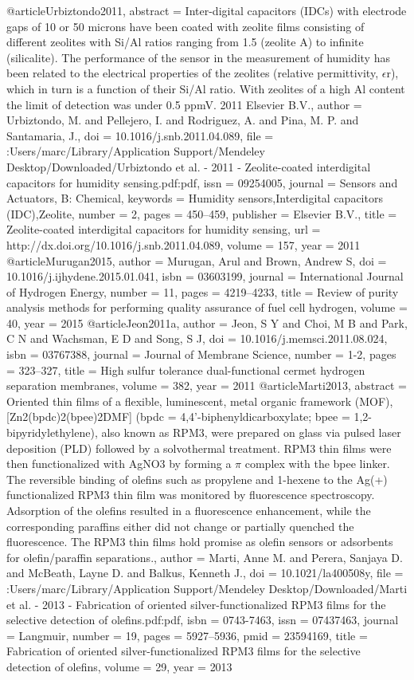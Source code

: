 @article{Urbiztondo2011,
abstract = {Inter-digital capacitors (IDCs) with electrode gaps of 10 or 50 microns have been coated with zeolite films consisting of different zeolites with Si/Al ratios ranging from 1.5 (zeolite A) to infinite (silicalite). The performance of the sensor in the measurement of humidity has been related to the electrical properties of the zeolites (relative permittivity, $\epsilon$r), which in turn is a function of their Si/Al ratio. With zeolites of a high Al content the limit of detection was under 0.5 ppmV. {\textcopyright} 2011 Elsevier B.V.},
author = {Urbiztondo, M. and Pellejero, I. and Rodriguez, A. and Pina, M. P. and Santamaria, J.},
doi = {10.1016/j.snb.2011.04.089},
file = {:Users/marc/Library/Application Support/Mendeley Desktop/Downloaded/Urbiztondo et al. - 2011 - Zeolite-coated interdigital capacitors for humidity sensing.pdf:pdf},
issn = {09254005},
journal = {Sensors and Actuators, B: Chemical},
keywords = {Humidity sensors,Interdigital capacitors (IDC),Zeolite},
number = {2},
pages = {450--459},
publisher = {Elsevier B.V.},
title = {{Zeolite-coated interdigital capacitors for humidity sensing}},
url = {http://dx.doi.org/10.1016/j.snb.2011.04.089},
volume = {157},
year = {2011}
}
@article{Murugan2015,
author = {Murugan, Arul and Brown, Andrew S},
doi = {10.1016/j.ijhydene.2015.01.041},
isbn = {03603199},
journal = {International Journal of Hydrogen Energy},
number = {11},
pages = {4219--4233},
title = {{Review of purity analysis methods for performing quality assurance of fuel cell hydrogen}},
volume = {40},
year = {2015}
}
@article{Jeon2011a,
author = {Jeon, S Y and Choi, M B and Park, C N and Wachsman, E D and Song, S J},
doi = {10.1016/j.memsci.2011.08.024},
isbn = {03767388},
journal = {Journal of Membrane Science},
number = {1-2},
pages = {323--327},
title = {{High sulfur tolerance dual-functional cermet hydrogen separation membranes}},
volume = {382},
year = {2011}
}
@article{Marti2013,
abstract = {Oriented thin films of a flexible, luminescent, metal organic framework (MOF), [Zn2(bpdc)2(bpee){\textperiodcentered}2DMF] (bpdc = 4,4'-biphenyldicarboxylate; bpee = 1,2-bipyridylethylene), also known as RPM3, were prepared on glass via pulsed laser deposition (PLD) followed by a solvothermal treatment. RPM3 thin films were then functionalized with AgNO3 by forming a $\pi$ complex with the bpee linker. The reversible binding of olefins such as propylene and 1-hexene to the Ag(+) functionalized RPM3 thin film was monitored by fluorescence spectroscopy. Adsorption of the olefins resulted in a fluorescence enhancement, while the corresponding paraffins either did not change or partially quenched the fluorescence. The RPM3 thin films hold promise as olefin sensors or adsorbents for olefin/paraffin separations.},
author = {Marti, Anne M. and Perera, Sanjaya D. and McBeath, Layne D. and Balkus, Kenneth J.},
doi = {10.1021/la400508y},
file = {:Users/marc/Library/Application Support/Mendeley Desktop/Downloaded/Marti et al. - 2013 - Fabrication of oriented silver-functionalized RPM3 films for the selective detection of olefins.pdf:pdf},
isbn = {0743-7463},
issn = {07437463},
journal = {Langmuir},
number = {19},
pages = {5927--5936},
pmid = {23594169},
title = {{Fabrication of oriented silver-functionalized RPM3 films for the selective detection of olefins}},
volume = {29},
year = {2013}
}
